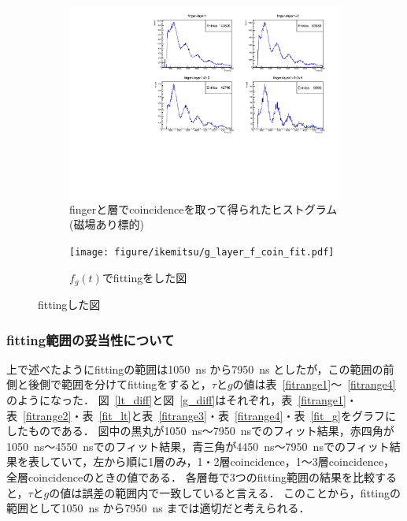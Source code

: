   \begin{figure}[H]
   \centering
   \begin{subfigure}{\columnwidth}
    \centering
    \includegraphics[height = 0.9\columnwidth , angle = -90]{figure/ikemitsu/g_layer_f_coin.pdf}
    \caption{fingerと層でcoincidenceを取って得られたヒストグラム(磁場あり標的)}
    \label{g_layercoin}
   \end{subfigure}
   \begin{subfigure}{\columnwidth}
    \centering
    \texttt{[image: figure/ikemitsu/g\_layer\_f\_coin\_fit.pdf]}
    \caption{$f_{g}(t)$でfittingをした図}
    \label{g_layercoin_fit}
   \end{subfigure}
   \caption{fittingした図}
   \label{g_layercoin_all}
  \end{figure}

  
    \subsubsection{fitting範囲の妥当性について}
  上で述べたようにfittingの範囲は1050~ns から7950~ns としたが，この範囲の前側と後側で範囲を分けてfittingをすると，$\tau$と$g$の値は表~\ref{fitrange1}〜~\ref{fitrange4}のようになった．
  図~\ref{lt_diff}と図~\ref{g_diff}はそれぞれ，表~\ref{fitrange1}・表~\ref{fitrange2}・表~\ref{fit_lt}と表~\ref{fitrange3}・表~\ref{fitrange4}・表~\ref{fit_g}をグラフにしたものである．
  図中の黒丸が1050~ns〜7950~nsでのフィット結果，赤四角が1050~ns〜4550~nsでのフィット結果，青三角が4450~ns〜7950~nsでのフィット結果を表していて，左から順に1層のみ，1・2層coincidence，1〜3層coincidence，全層coincidenceのときの値である．
  各層毎で3つのfitting範囲の結果を比較すると，$\tau$と$g$の値は誤差の範囲内で一致していると言える．
  このことから，fittingの範囲として1050~ns から7950~ns までは適切だと考えられる．

